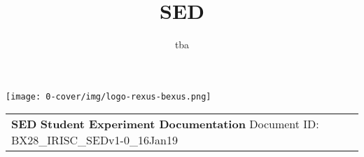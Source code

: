 \documentclass[a4paper,12pt,oneside]{article}
\title{SED}
\author{tba}
\begin{document}
\hypersetup{allcolors=black}

\thispagestyle{cover}


\begin{flushright}
\texttt{[image: 0-cover/img/logo-rexus-bexus.png]} 
\end{flushright}

\begin{flushright}

\begin{tabular}{p{} r}
\vspace{-1cm}
{{\hspace{-8pt}\huge{\textbf{SED}}} \vspace{15pt} \newline \vspace{15pt}
{\hspace{-11pt}\large{\textbf{Student Experiment Documentation}}} \newline \vspace{30pt}
{\hspace{-11pt}\footnotesize{Document ID: BX28\_IRISC\_SEDv1-0\_16Jan19}}}
& \hspace{3pt}\multirow{3}{*}{\texttt{[image: 0-cover/img/logo-irisc.png]}} %
\end{tabular}
\end{flushright}
\end{document}
